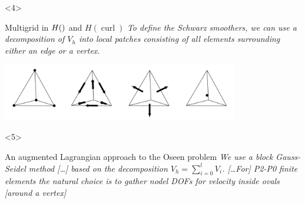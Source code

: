 \documentclass[presentation,aspectratio=43, 10pt]{beamer}
\let\div\relax
\DeclareMathOperator{\div}{div}
\DeclareMathOperator{\curl}{curl}
\begin{document}
\begin{frame}[t]
  \begin{onlyenv}<4>
    \begin{block}{Multigrid in $H(\div)$ and $H(\curl)$}
      \emph{To define the Schwarz smoothers, we can use a decomposition of
      $V_h$ into local patches consisting of all elements surrounding
      either an edge or a vertex.}

      \begin{center}
        \includegraphics[height=2.5cm]{arnold}
      \end{center}
      {\hfill\textcite{Arnold:2000}}
    \end{block}
  \end{onlyenv}

  \begin{onlyenv}<5>
    \begin{block}{An augmented Lagrangian approach to the Oseen problem}
      \emph{We use a block Gauss-Seidel method [\dots] based on the
      decomposition $V_h = \sum_{i=0}^l V_i$. [\dots For] P2-P0 finite
      elements the natural choice is to gather nodel DOFs for velocity
      inside ovals [around a vertex]}


\end{block}
\end{onlyenv}
\end{frame}
\end{document}
